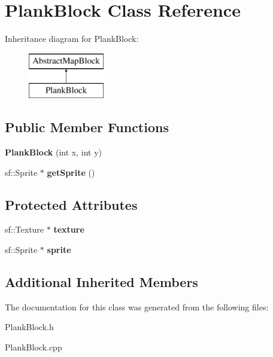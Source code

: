 \hypertarget{class_plank_block}{}\section{Plank\+Block Class Reference}
\label{class_plank_block}
Inheritance diagram for Plank\+Block\+:\begin{figure}[H]
\begin{center}
\leavevmode
\includegraphics[height=2.000000cm]{class_plank_block}
\end{center}
\end{figure}
\subsection*{Public Member Functions}
\begin{DoxyCompactItemize}
\item 
\mbox{\label{class_plank_block_afed7c0965c7e1e4b9ec98a4ff06825df}} 
{\bfseries Plank\+Block} (int x, int y)
\item 
\mbox{\label{class_plank_block_abada589bb200fd82fcfe00482ad6a32f}} 
sf\+::\+Sprite $\ast$ {\bfseries get\+Sprite} ()
\end{DoxyCompactItemize}
\subsection*{Protected Attributes}
\begin{DoxyCompactItemize}
\item 
\mbox{\label{class_plank_block_a9b6bada075fecb031e3db24eff50fd19}} 
sf\+::\+Texture $\ast$ {\bfseries texture}
\item 
\mbox{\label{class_plank_block_a28e42e2ccc8973b39b3c1fbdeee78c36}} 
sf\+::\+Sprite $\ast$ {\bfseries sprite}
\end{DoxyCompactItemize}
\subsection*{Additional Inherited Members}


The documentation for this class was generated from the following files\+:\begin{DoxyCompactItemize}
\item 
Plank\+Block.\+h\item 
Plank\+Block.\+cpp\end{DoxyCompactItemize}

